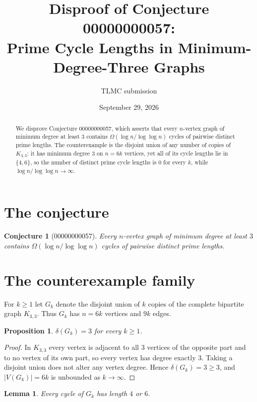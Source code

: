 \documentclass[11pt]{article}
\title{Disproof of Conjecture 00000000057:\\
Prime Cycle Lengths in Minimum-Degree-Three Graphs}
\author{TLMC submission}
\date{September 29, 2026}
\newtheorem{lemma}[theorem]{Lemma}
\newtheorem{proposition}[theorem]{Proposition}
\newtheorem{conjecture}{Conjecture}
\begin{document}
\maketitle

\begin{abstract}
We disprove Conjecture 00000000057, which asserts that every $n$-vertex graph
of minimum degree at least $3$ contains $\Omega(\log n / \log\log n)$ cycles of
pairwise distinct prime lengths. The counterexample is the disjoint union of
any number of copies of $K_{3,3}$: it has minimum degree $3$ on $n = 6k$
vertices, yet all of its cycle lengths lie in $\{4,6\}$, so the number of
distinct prime cycle lengths is $0$ for every $k$, while
$\log n/\log\log n \to \infty$.
\end{abstract}

\section{The conjecture}

\begin{conjecture}[00000000057]
Every $n$-vertex graph of minimum degree at least $3$ contains
$\Omega(\log n / \log\log n)$ cycles of pairwise distinct prime lengths.
\end{conjecture}

\section{The counterexample family}

For $k \ge 1$ let $G_k$ denote the disjoint union of $k$ copies of the
complete bipartite graph $K_{3,3}$. Thus $G_k$ has $n = 6k$ vertices and
$9k$ edges.

\begin{proposition}\label{prop:mindeg}
$\delta(G_k) = 3$ for every $k \ge 1$.
\end{proposition}

\begin{proof}
In $K_{3,3}$ every vertex is adjacent to all $3$ vertices of the opposite
part and to no vertex of its own part, so every vertex has degree exactly
$3$. Taking a disjoint union does not alter any vertex degree. Hence
$\delta(G_k) = 3 \ge 3$, and $|V(G_k)| = 6k$ is unbounded as $k \to \infty$.
\end{proof}

\begin{lemma}\label{lem:lengths}
Every cycle of $G_k$ has length $4$ or $6$.
\end{lemma}
\end{document}
